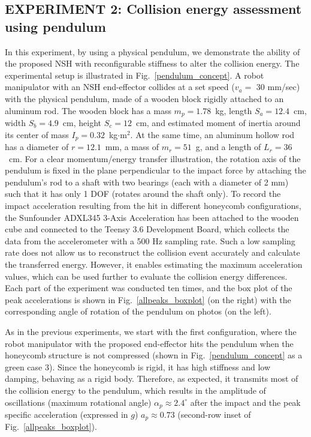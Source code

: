 \documentclass[lettersize,journal]{IEEEtran}
\begin{document}
\subsection{EXPERIMENT 2: Collision energy assessment using pendulum}


In this experiment, by using a physical pendulum, we demonstrate the ability of the proposed NSH with reconfigurable stiffness to alter the collision energy. The experimental setup is illustrated in Fig.~\ref{pendulum_concept}. A robot manipulator with an NSH end-effector collides at a set speed ($v_a=$ 30 mm/sec) with the physical pendulum, made of a wooden block rigidly attached to an aluminum rod. The wooden block has a mass $m_p=1.78$~kg, length $S_a=12.4$~cm, width $S_b=4.9$~cm, height $S_c=12$~cm, and estimated moment of inertia around its center of mass $I_p=0.32$~kg$\cdot$m$^2$. At the same time, an aluminum hollow rod has a diameter of $r=12.1$~mm, a mass of $m_r=51$~g, and a length of $L_r=36$~cm. For a clear momentum/energy transfer illustration, the rotation axis of the pendulum is fixed in the plane perpendicular to the impact force by attaching the pendulum's rod to a shaft with two bearings (each with a diameter of 2 mm) such that it has only 1 DOF (rotates around the shaft only). To record the impact acceleration resulting from the hit in different honeycomb configurations, the Sunfounder ADXL345 3-Axis Acceleration has been attached to the wooden cube and connected to the Teensy 3.6 Development Board, which collects the data from the accelerometer with a 500 Hz sampling rate. Such a low sampling rate does not allow us to reconstruct the collision event accurately and calculate the transferred energy. However, it enables estimating the maximum acceleration values, which can be used further to evaluate the collision energy differences. Each part of the experiment was conducted ten times, and the box plot of the peak accelerations is shown in Fig.~\ref{allpeaks_boxplot} (on the right) with the corresponding angle of rotation of the pendulum on photos (on the left).

As in the previous experiments, we start with the first configuration, where the robot manipulator with the proposed end-effector hits the pendulum when the honeycomb structure is not compressed (shown in Fig.~\ref{pendulum_concept} as a green case 3). Since the honeycomb is rigid, it has high stiffness and low damping, behaving as a rigid body. Therefore, as expected, it transmits most of the collision energy to the pendulum, which results in the amplitude of oscillations (maximum rotational angle) $\alpha_p\approx2.4^{\circ}$ after the impact and the peak specific acceleration (expressed in $g$) $a_p \approx {0.73}$ (second-row inset of Fig.~\ref{allpeaks_boxplot}). 
\end{document}
